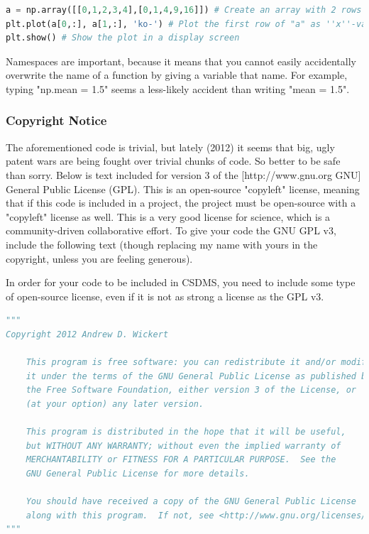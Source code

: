 \documentclass[a4paper,10pt]{scrartcl}
\begin{document}
\begin{lstlisting}[language=Python]
a = np.array([[0,1,2,3,4],[0,1,4,9,16]]) # Create an array with 2 rows and 3 columns - nested sets of brackets add dimensions to the array
plt.plot(a[0,:], a[1,:], 'ko-') # Plot the first row of "a" as ''x''-values and the second row as ''y''-values with a dashed line between points
plt.show() # Show the plot in a display screen
\end{lstlisting}

Namespaces are important, because it means that you cannot easily accidentally overwrite the name of a function by giving a variable that name. For example, typing "np.mean = 1.5" seems a less-likely accident than writing "mean = 1.5".

\subsubsection{Copyright Notice}

The aforementioned code is trivial, but lately (2012) it seems that big, ugly patent wars are being fought over trivial chunks of code. So better to be safe than sorry. Below is text included for version 3 of the [http://www.gnu.org GNU] General Public License (GPL). This is an open-source "copyleft" license, meaning that if this code is included in a project, the project must be open-source with a "copyleft" license as well. This is a very good license for science, which is a community-driven collaborative effort. To give your code the GNU GPL v3, include the following text (though replacing my name with yours in the copyright, unless you are feeling generous).

In order for your code to be included in CSDMS, you need to include some type of open-source license, even if it is not as strong a license as the GPL v3.

\begin{lstlisting}[language=Python]
"""
Copyright 2012 Andrew D. Wickert

    This program is free software: you can redistribute it and/or modify
    it under the terms of the GNU General Public License as published by
    the Free Software Foundation, either version 3 of the License, or
    (at your option) any later version.

    This program is distributed in the hope that it will be useful,
    but WITHOUT ANY WARRANTY; without even the implied warranty of
    MERCHANTABILITY or FITNESS FOR A PARTICULAR PURPOSE.  See the
    GNU General Public License for more details.

    You should have received a copy of the GNU General Public License
    along with this program.  If not, see <http://www.gnu.org/licenses/>.
"""
\end{lstlisting}
\end{document}
